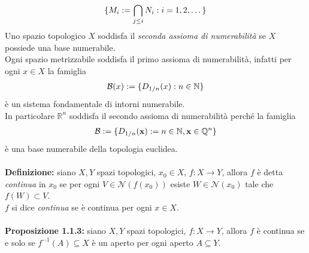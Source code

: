 \documentclass{article}
\begin{document}
\begin{gather}
    \{ M_i := \bigcap_{j \leq i} N_i : i = 1, 2, \dots \} \notag
\end{gather}
Uno spazio topologico $X$ soddisfa il \textit{seconda assioma di numerabilità} se $X$ possiede una base numerabile. \\
Ogni spazio metrizzabile soddisfa il primo assioma di numerabilità, infatti per ogni $x \in X$ la famiglia
\begin{gather}
    \mathcal{B}(x) := \{ D_{1/n}(x) : n \in \mathbb{N} \} \notag
\end{gather}
è un sistema fondamentale di intorni numerabile. \\
In particolare $\mathbb{R}^n$ soddisfa il secondo assioma di numerabilità perché la famiglia
\begin{gather}
    \mathcal{B} := \{ D_{1/n}(\mathbf{x}) := n \in \mathbb{N}, \mathbf{x} \in \mathbb{Q}^n \} \notag
\end{gather}
è una base numerabile della topologia euclidea. \\ \\
\textbf{Definizione:} siano $X, Y$ spazi topologici, $x_0 \in X$, $f : X \longrightarrow Y$, allora $f$ è detta \textit{continua} in $x_0$ se per ogni $V \in \mathcal{N}(f(x_0))$ esiste $W \in \mathcal{N}(x_0)$ tale che $f(W) \subset V$. \\
$f$ si dice \textit{continua} se è continua per ogni $x \in X$. \\ \\
\textbf{Proposizione 1.1.3:} siano $X, Y$ spazi topologici, $f : X \longrightarrow Y$, allora $f$ è continua se e solo se $f^{-1}(A) \subseteq X$ è un aperto per ogni aperto $A \subseteq Y$. \\
\end{document}
